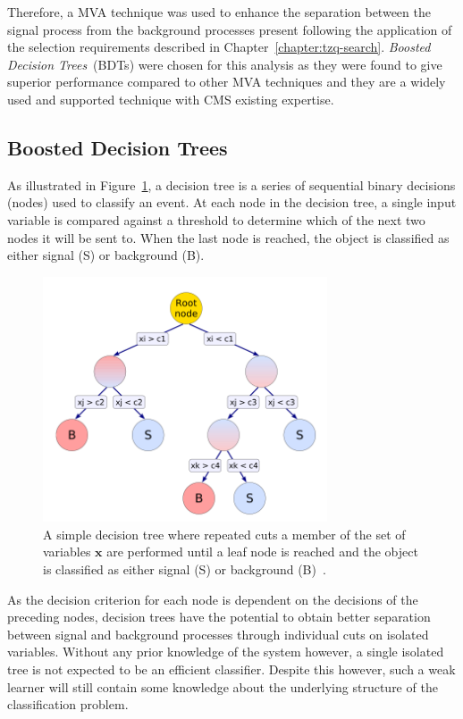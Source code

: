 Therefore, a MVA technique was used to enhance the separation between the signal process from the background processes present following the application of the selection requirements described in Chapter~\ref{chapter:tzq-search}.
\emph{Boosted Decision Trees}~(BDTs) were chosen for this analysis as they were found to give superior performance compared to other MVA techniques and they are a widely used and supported technique with CMS existing expertise.

\subsection{Boosted Decision Trees}\label{subsec:bdt}
As illustrated in Figure~\ref{fig:decisionTree}, a decision tree is a series of sequential binary decisions (nodes) used to classify an event.
At each node in the decision tree, a single input variable is compared against a threshold to determine which of the next two nodes it will be sent to.
When the last node is reached, the object is classified as either signal (S) or background (B).

\begin{figure}[h]
\centering
\includegraphics[width=0.75\textwidth]{figs/background-estimation/decisionTree.pdf}
\caption{A simple decision tree where repeated cuts a member of the set of variables $\textbf{x}$ are performed until a leaf node is reached and the object is classified as either signal (S) or background (B)~\cite{Hocker:2007ht}.
}
\label{fig:decisionTree}
\end{figure}

As the decision criterion for each node is dependent on the decisions of the preceding nodes, decision trees have the potential to obtain better separation between signal and background processes through individual cuts on isolated variables.
Without any prior knowledge of the system however, a single isolated tree is not expected to be an efficient classifier.
Despite this however, such a weak learner will still contain some knowledge about the underlying structure of the classification problem.

